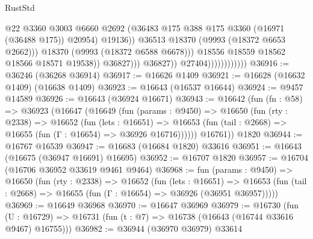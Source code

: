 \begin{lexlean}{RustStd}
\begin{coremodule}
                                                  @22
                                                  @3360
                                                  @3003
                                                  @6660
                                                  @2692
                                                  (@36483
                                                    @175
                                                    @388
                                                    @175
                                                    @3360
                                                    (@16971 (@36488 @175))
                                                    @20954)
                                                  @19136))
                                              @36513
                                              @18370
                                              (@9993 (@18372 @6653 @2662)))
                                            @18370
                                            (@9993 (@18372 @6588 @6678)))
                                          @18556
                                          @18559
                                          @18562
                                          @18566
                                          @18571
                                          @19538))
                                      @36827)))
                                @36827))
                            @27404))))))))))))
@36916 := @36246 (@36268 @36914)
@36917 := @16626 @1409
@36921 := @16628 (@16632 @1409) (@16638 @1409)
@36923 := @16643 (@16537 @16644)
@36924 := @9457 @14589
@36926 := @16643 (@36924 @16671)
@36943 := @16642
    (fun (fn : @58) =>
    @36923
      (@16647
        (@16649
          (fun (params : @9450) =>
          @16650
            (fun (rty : @2338) =>
            @16652
              (fun (lets : @16651) =>
              @16653 (fun (tail : @2668) => @16655 (fun (Γ : @16654) => @36926 @16716))))))
        @16761))
    @1820
@36944 := @16767 @16539
@36947 := @16683 (@16684 @1820) @33616
@36951 := @16643 (@16675 (@36947 @16691) @16695)
@36952 := @16707 @1820
@36957 := @16704 (@16706 @36952 @33619 @9461 @9464)
@36968 := fun (params : @9450) =>
  @16650
    (fun (rty : @2338) =>
    @16652
      (fun (lets : @16651) =>
      @16653 (fun (tail : @2668) => @16655 (fun (Γ : @16654) => @36926 (@36951 @36957)))))
@36969 := @16649 @36968
@36970 := @16647 @36969
@36979 := @16730
    (fun (U : @16729) => @16731 (fun (t : @7) => @16738 (@16643 (@16744 @33616 @9467) @16755)))
@36982 := @36944 (@36970 @36979) @33614

\end{coremodule}
\end{lexlean}
